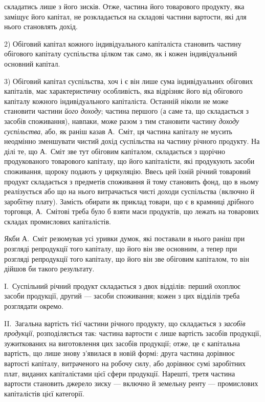 \parcont{}  %
складатись лише з його зисків. Отже, частина його товарового продукту,
яка заміщує його капітал, не розкладається на складові частини вартости,
які для нього становлять дохід.

2) Обіговий капітал кожного індивідуального капіталіста становить
частину обігового капіталу суспільства цілком так само, як і кожен індивідуальний
основний капітал.

3) Обіговий капітал суспільства, хоч і є він лише сума індивідуальних
обігових капіталів, має характеристичну особливість, яка відрізняє
його від обігового капіталу кожного індивідуального капіталіста. Останній
ніколи не може становити частини \emph{його доходу}; частина першого
(а саме та, що складається з засобів споживання), навпаки, може разом
з тим становити частину \emph{доходу суспільства}, або, як раніш казав
А.~Сміт, ця частина капіталу не мусить неодмінно зменшувати чистий
дохід суспільства на частину річного продукту. На ділі те, що А.~Сміт
зве тут обіговим капіталом, складається з щорічно продукованого товарового
капіталу, що його капіталісти, які продукують засоби споживання,
щороку подають у циркуляцію. Ввесь цей їхній річний товаровий продукт
складається з предметів споживання й тому становить фонд, що в ньому
реалізується або що на нього витрачається чисті доходи суспільства (включно
й заробітну плату). Замість обирати як приклад товари, що є в крамниці
дрібного торговця, А.~Смітові треба було б взяти маси продуктів, що
лежать на товарових складах промислових капіталістів.

Якби А.~Сміт резюмував усі уривки думок, які поставали в нього
раніш при розгляді репродукції того капіталу, що його він зве основним,
а тепер при розгляді репродукції того капіталу, що його він зве
обіговим капіталом, то він дійшов би такого результату.

I.~Суспільний річний продукт складається з двох відділів: перший
охоплює засоби продукції, другий — засоби споживання; кожен з цих
відділів треба розглядати окремо.

II.~Загальна вартість тієї частини річного продукту, що складається
з \emph{засобів продукції}, розподіляється так: частина вартости є
лише вартість засобів продукції, зужиткованих на виготовлення цих засобів
продукції; отже, це є капітальна вартість, що лише знову з’явилася
в новій формі: друга частина дорівнює вартості капіталу, витраченого
на робочу силу, або дорівнює сумі заробітних плат, виданих капіталістами
цієї сфери продукції. Нарешті, третя частина вартости становить
джерело зиску — включно й земельну ренту — промислових капіталістів
цієї категорії.

